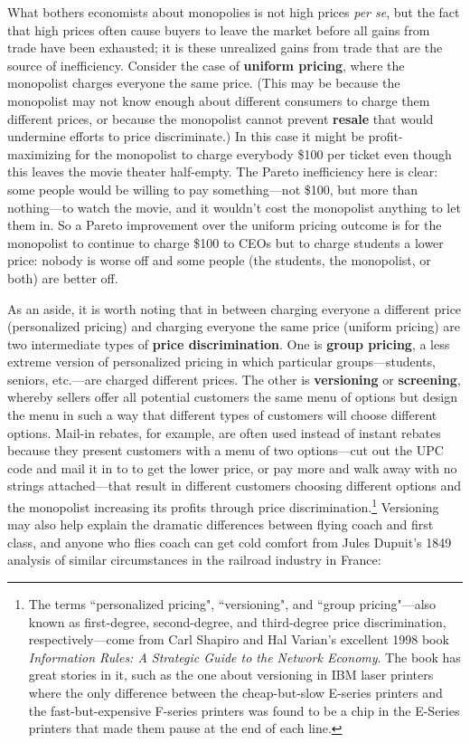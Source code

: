 What bothers economists about monopolies is not high prices \emph{per se}, but the fact that high prices often cause buyers to leave the market before all gains from trade have been exhausted; it is these unrealized gains from trade that are the source of inefficiency. Consider the case of \textbf{uniform pricing}, where the monopolist charges everyone the same price. (This may be because the monopolist may not know enough about different consumers to charge them different prices, or because the monopolist cannot prevent \textbf{resale} that would undermine efforts to price discriminate.) In this case it might be profit-maximizing for the monopolist to charge everybody \$100 per ticket even though this leaves the movie theater half-empty. The Pareto inefficiency here is clear: some people would be willing to pay something---not \$100, but more than nothing---to watch the movie, and it wouldn't cost the monopolist anything to let them in. So a Pareto improvement over the uniform pricing outcome is for the monopolist to continue to charge \$100 to CEOs but to charge students a lower price: nobody is worse off and some people (the students, the monopolist, or both) are better off.

As an aside, it is worth noting that in between charging everyone a different price (personalized pricing) and charging everyone the same price (uniform pricing) are two intermediate types of \textbf{price discrimination}. One is \textbf{group pricing}, a less extreme version of personalized pricing in which particular groups---students, seniors, etc.---are charged different prices. The other is \textbf{versioning} or \textbf{screening}, whereby sellers offer all potential customers the same menu of options but design the menu in such a way that different types of customers will choose different options. Mail-in rebates, for example, are often used instead of instant rebates because they present customers with a menu of two options---cut out the UPC code and mail it in to to get the lower price, or pay more and walk away with no strings attached---that result in different customers choosing different options and the monopolist increasing its profits through price discrimination.\footnote{The terms ``personalized pricing", ``versioning", and ``group pricing"---also known as first-degree, second-degree, and third-degree price discrimination, respectively---come from Carl Shapiro and Hal Varian's excellent 1998 book \emph{Information Rules: A Strategic Guide to the Network Economy}. The book has great stories in it, such as the one about versioning in IBM laser printers where the only difference between the cheap-but-slow E-series printers and the fast-but-expensive F-series printers was found to be a chip in the E-Series printers that made them pause at the end of each line.} Versioning may also help explain the dramatic differences between flying coach and first class, and anyone who flies coach can get cold comfort from Jules Dupuit's 1849 analysis of similar circumstances in the railroad industry in France:

